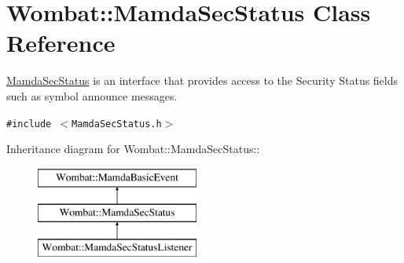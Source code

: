 \hypertarget{classWombat_1_1MamdaSecStatus}{
\section{Wombat::Mamda\-Sec\-Status Class Reference}
\label{classWombat_1_1MamdaSecStatus}
}
\hyperlink{classWombat_1_1MamdaSecStatus}{Mamda\-Sec\-Status} is an interface that provides access to the Security Status fields such as symbol announce messages.  


{\tt \#include $<$Mamda\-Sec\-Status.h$>$}

Inheritance diagram for Wombat::Mamda\-Sec\-Status::\begin{figure}[H]
\begin{center}
\leavevmode
\includegraphics[height=3cm]{classWombat_1_1MamdaSecStatus}
\end{center}
\end{figure}
